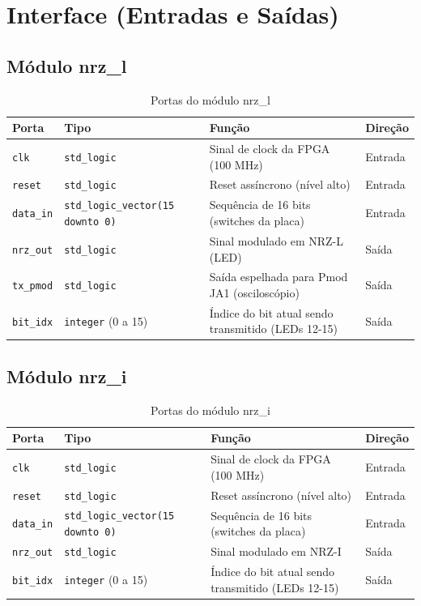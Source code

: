 \documentclass[11pt,a4paper]{article}
\begin{document}
\section{Interface (Entradas e Saídas)}

\subsection{Módulo nrz\_l}

\begin{table}[H]
\centering
\begin{tabularx}{\textwidth}{|l|l|X|l|}
\hline
\textbf{Porta} & \textbf{Tipo} & \textbf{Função} & \textbf{Direção} \\
\hline
\texttt{clk} & \texttt{std\_logic} & Sinal de clock da FPGA (100 MHz) & Entrada \\
\hline
\texttt{reset} & \texttt{std\_logic} & Reset assíncrono (nível alto) & Entrada \\
\hline
\texttt{data\_in} & \texttt{std\_logic\_vector(15 downto 0)} & Sequência de 16 bits (switches da placa) & Entrada \\
\hline
\texttt{nrz\_out} & \texttt{std\_logic} & Sinal modulado em NRZ-L (LED) & Saída \\
\hline
\texttt{tx\_pmod} & \texttt{std\_logic} & Saída espelhada para Pmod JA1 (osciloscópio) & Saída \\
\hline
\texttt{bit\_idx} & \texttt{integer} (0 a 15) & Índice do bit atual sendo transmitido (LEDs 12-15) & Saída \\
\hline
\end{tabularx}
\caption{Portas do módulo nrz\_l}
\end{table}

\subsection{Módulo nrz\_i}

\begin{table}[H]
\centering
\begin{tabularx}{\textwidth}{|l|l|X|l|}
\hline
\textbf{Porta} & \textbf{Tipo} & \textbf{Função} & \textbf{Direção} \\
\hline
\texttt{clk} & \texttt{std\_logic} & Sinal de clock da FPGA (100 MHz) & Entrada \\
\hline
\texttt{reset} & \texttt{std\_logic} & Reset assíncrono (nível alto) & Entrada \\
\hline
\texttt{data\_in} & \texttt{std\_logic\_vector(15 downto 0)} & Sequência de 16 bits (switches da placa) & Entrada \\
\hline
\texttt{nrz\_out} & \texttt{std\_logic} & Sinal modulado em NRZ-I & Saída \\
\hline
\texttt{bit\_idx} & \texttt{integer} (0 a 15) & Índice do bit atual sendo transmitido (LEDs 12-15) & Saída \\
\hline
\end{tabularx}
\caption{Portas do módulo nrz\_i}
\end{table}
\end{document}
